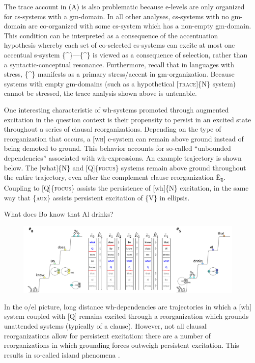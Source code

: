   The trace account in (A) is also problematic because e-levels are only organized for cs-systems with a gm-domain. In all other analyses, cs-systems with no gm-domain are co-organized with some cs-system which has a non-empty gm-domain. This condition can be interpreted as a consequence of the accentuation hypothesis whereby each set of co-selected cs-systems can excite at most one accentual s-system \{\^{}\}—\{\^{}\} is viewed as a consequence of selection, rather than a syntactic-conceptual resonance. Furthermore, recall that in languages with stress, \{\^{}\} manifests as a primary stress/accent in gm-organization. Because systems with empty gm-domains (such as a hypothetical [\textsc{trace}]\{N\} system) cannot be stressed, the trace analysis shown above is untenable.

  One interesting characteristic of wh-systems promoted through augmented excitation in the question context is their propensity to persist in an excited state throughout a series of clausal reorganizations. Depending on the type of reorganization that occurs, a [\textsc{wh}] c-system can remain above ground instead of being demoted to ground. This behavior accounts for so-called “unbounded dependencies” associated with wh-expressions. An example trajectory is shown below. The [what]\{N\} and [Q]\{\textsc{focus}\} systems remain above ground throughout the entire trajectory, even after the complement clause reorganization Ê\textsubscript{5}. Coupling to  [Q]\{\textsc{focus}\} assists the persistence of [wh]\{N\} excitation, in the same way that \{\textsc{aux}\} assists persistent excitation of \{V\} in ellipsis. 

  \ea
    {What does Bo know that Al drinks?}
\z
  
\begin{figure}
\includegraphics[width=\textwidth]{figures/Tilsen-img162.png}
\caption{\missingcaption}
\label{fig:}
\end{figure}
 

  In the o/el picture, long distance wh-dependencies are trajectories in which a [wh] system coupled with [Q] remains excited through a reorganization which grounds unattended systems (typically of a clause). However, not all clausal reorganizations allow for persistent excitation: there are a number of reorganizations in which grounding forces outweigh persistent excitation. This results in so-called island phenomena \citep{Ross1967}.

